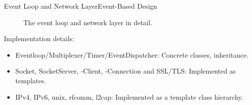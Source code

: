 \begin{frame}{Event Loop and Network Layer}{Event-Based Design}
\begin{center}
\begin{figure}
      \caption{The event loop and network layer in detail.}
    \end{figure}
  \end{center}
  Implementation details:
  \begin{itemize}
    \item \alert{Eventloop/Multiplexer/Timer/EventDispatcher}: Concrete classes, inheritance.
     \item \alert{Socket, SocketServer, -Client, -Connection and SSL/TLS}: Implemented as templates.
     \item \alert{IPv4, IPv6, unix, rfcomm, l2cap}: Implemented as a template class hierarchy.
  \end{itemize}
\end{frame}
